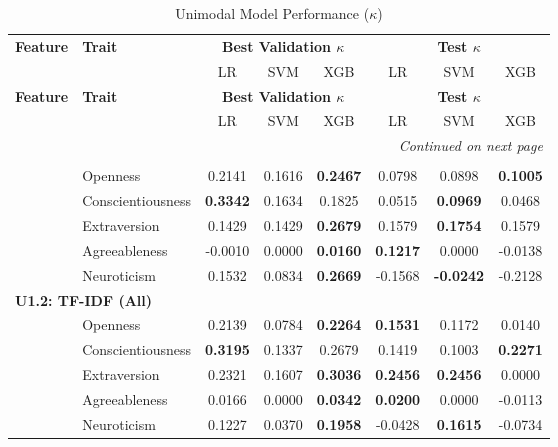 \small
\setlength{\tabcolsep}{4pt}

\begin{longtable}{llcccccc}
\caption{Unimodal Model Performance ($\kappa$)}\label{tab:unimodal_results_full} \\

\hline
\textbf{Feature} & \textbf{Trait} & \multicolumn{3}{c}{\textbf{Best Validation $\kappa$}} & \multicolumn{3}{c}{\textbf{Test $\kappa$}} \\
\cline{3-8}
 &  & LR & SVM & XGB & LR & SVM & XGB \\
\hline
\endfirsthead

\hline
\textbf{Feature} & \textbf{Trait} & \multicolumn{3}{c}{\textbf{Best Validation $\kappa$}} & \multicolumn{3}{c}{\textbf{Test $\kappa$}} \\
\cline{3-8}
 &  & LR & SVM & XGB & LR & SVM & XGB \\
\hline
\endhead

\hline
\multicolumn{8}{r}{\textit{Continued on next page}} \\
\endfoot

\hline
\endlastfoot

\multicolumn{8}{l}{\textbf{U1.1: TF-IDF (1,500 features)}} \\
& Openness & 0.2141 & 0.1616 & \textbf{0.2467} & 0.0798 & 0.0898 & \textbf{0.1005} \\
& Conscientiousness & \textbf{0.3342} & 0.1634 & 0.1825 & 0.0515 & \textbf{0.0969} & 0.0468 \\
& Extraversion & 0.1429 & 0.1429 & \textbf{0.2679} & 0.1579 & \textbf{0.1754} & 0.1579 \\
& Agreeableness & -0.0010 & 0.0000 & \textbf{0.0160} & \textbf{0.1217} & 0.0000 & -0.0138 \\
& Neuroticism & 0.1532 & 0.0834 & \textbf{0.2669} & -0.1568 & \textbf{-0.0242} & -0.2128 \\

\hline
\multicolumn{8}{l}{\textbf{U1.2: TF-IDF (All)}} \\[3pt]

& Openness & 0.2139 & 0.0784 & \textbf{0.2264} & \textbf{0.1531} & 0.1172 & 0.0140 \\
& Conscientiousness & \textbf{0.3195} & 0.1337 & 0.2679 & 0.1419 & 0.1003 & \textbf{0.2271} \\
& Extraversion & 0.2321 & 0.1607 & \textbf{0.3036} & \textbf{0.2456} & \textbf{0.2456} & 0.0000 \\
& Agreeableness & 0.0166 & 0.0000 & \textbf{0.0342} & \textbf{0.0200} & 0.0000 & -0.0113 \\
& Neuroticism & 0.1227 & 0.0370 & \textbf{0.1958} & -0.0428 & \textbf{0.1615} & -0.0734 \\


\end{longtable}

